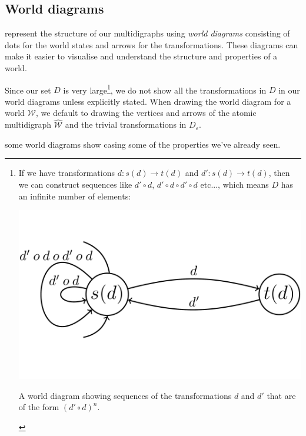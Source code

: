 \subsection{World diagrams}

 represent the structure of our multidigraphs using \emph{world diagrams} consisting of dots for the world states and arrows for the transformations.
These diagrams can make it easier to visualise and understand the structure and properties of a world.

Since our set $D$ is very large\footnote{
	If we have transformations $d: s(d) \to t(d)$ and $d': s(d) \to t(d)$, then we can construct sequences like $d' \circ d$, $d' \circ d \circ d' \circ d$ etc..., which means $D$ has an infinite number of elements:
	\begin{center}
		\FloatBarrier
		\captionsetup{type=figure}
		\includegraphics[width=1.0\linewidth]{2MathematicalFramework/Images/D_commonly_large.png}
		\caption{A world diagram showing sequences of the transformations $d$ and $d'$ that are of the form $(d' \circ d)^{n}$.}
	\end{center}
}, we do not show all the transformations in $D$ in our world diagrams unless explicitly stated.
When drawing the world diagram for a world $\mathscr{W}$, we default to drawing the vertices and arrows of the atomic multidigraph $\hat{\mathscr{W}}$ and the trivial transformations in $D_{\varepsilon}$.

 some world diagrams show casing some of the properties we've already seen.

